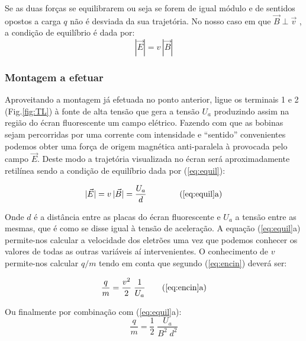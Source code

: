\documentclass[a4paper,twoside,12pt]{article}      %
\begin{document}
Se as duas forças se equilibrarem ou seja se forem de igual módulo e de sentidos opostos a carga $q$ não é desviada da sua trajetória. No nosso caso em que $\vec{B} \perp \vec{v}$ , a condição de equilíbrio é dada por:
\begin{equation}
	\label{eq:equil}
 |\vec{E}| = v\, |\vec{B}|
\end{equation}

\subsubsection{\sf Montagem a efetuar}

Aproveitando a montagem já efetuada no ponto anterior, ligue os terminais 1 e 2 (Fig.\ref{fig:TL}) à fonte de alta tensão que gera a tensão $U_a$ produzindo assim na região do écran fluorescente um campo elétrico. Fazendo com que as bobinas sejam percorridas por uma corrente com intensidade e  ``sentido'' convenientes podemos obter uma força de origem magnética anti-paralela à provocada pelo campo $\vec{E}$. 
Deste modo a trajetória visualizada no écran será aproximadamente retilínea sendo a condição de equilíbrio dada por (\ref{eq:equil}):

\begin{equation*}
 |\vec{E}| = v\, |\vec{B}| = \frac{U_a}{d} \qquad  \qquad  \textrm{(\ref{eq:equil}a)}
\end{equation*}


Onde $d$ é a distância entre as placas do écran fluorescente e $U_a$ a tensão entre as mesmas, que é como se disse igual à tensão de aceleração. A equação (\ref{eq:equil}a) permite-nos calcular a velocidade dos eletrões uma vez que podemos conhecer os valores de todas as outras variáveis aí intervenientes. O conhecimento de $v$ permite-nos calcular $q/m$ tendo em conta que segundo (\ref{eq:encin}) deverá ser:

\begin{equation*}
\frac{q}{m} = \frac{v^2}{2} \; \frac{1}{U_a} \qquad \textrm{(\ref{eq:encin}a)}
\end{equation*}

Ou finalmente por combinação com (\ref{eq:equil}a):
\begin{equation}
\frac{q}{m} = \frac{1}{2} \; \frac{U_a}{B^2\; d^2} 
\end{equation}
\end{document}
